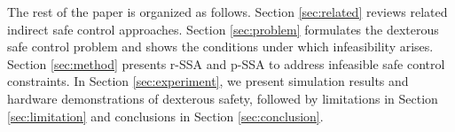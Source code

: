 The rest of the paper is organized as follows.
Section \ref{sec:related} reviews related indirect safe control approaches.
Section \ref{sec:problem} formulates the dexterous safe control problem and shows the conditions under which infeasibility arises.
Section \ref{sec:method} presents r-SSA and p-SSA to address infeasible safe control constraints.
In Section \ref{sec:experiment}, we present simulation results and hardware demonstrations of dexterous safety, followed by limitations in Section \ref{sec:limitation} and conclusions in Section \ref{sec:conclusion}.

 

